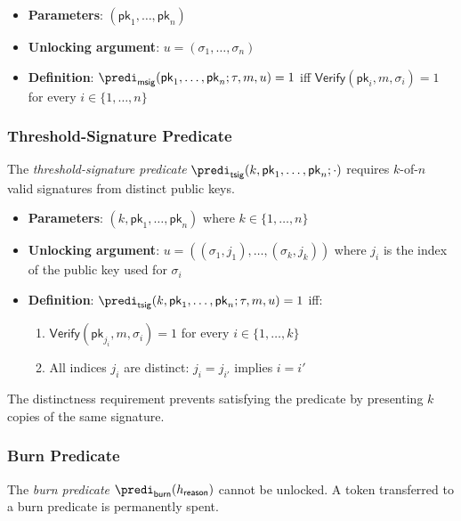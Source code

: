\begin{itemize}
	\item \textbf{Parameters}: $(\mathsf{pk}_1, \ldots, \mathsf{pk}_n)$
	\item \textbf{Unlocking argument}: $u = (\sigma_1, \ldots, \sigma_n)$
	\item \textbf{Definition}: $\predi_\mathsf{msig}(\mathsf{pk}_1, \ldots, \mathsf{pk}_n; \tau, m, u) = 1$ iff $\mathsf{Verify}(\mathsf{pk}_i, m, \sigma_i) = 1$ for every $i \in \{1, \ldots, n\}$
\end{itemize}


\subsubsection{Threshold-Signature Predicate}

The \emph{threshold-signature predicate} $\predi_\mathsf{tsig}(k, \mathsf{pk}_1, \ldots, \mathsf{pk}_n;\cdot)$ requires $k$-of-$n$ valid signatures from distinct public keys.

\begin{itemize}
	\item \textbf{Parameters}: $(k, \mathsf{pk}_1, \ldots, \mathsf{pk}_n)$ where $k \in \{1, \ldots, n\}$
	\item \textbf{Unlocking argument}: $u = ((\sigma_1, j_1), \ldots, (\sigma_k, j_k))$ where $j_i$ is the index of the public key used for $\sigma_i$
	\item \textbf{Definition}: $\predi_\mathsf{tsig}(k, \mathsf{pk}_1, \ldots, \mathsf{pk}_n; \tau, m, u) = 1$ iff:
	\begin{enumerate}
		\item $\mathsf{Verify}(\mathsf{pk}_{j_i}, m, \sigma_i) = 1$ for every $i \in \{1, \ldots, k\}$
		\item All indices $j_i$ are distinct: $j_i = j_{i'}$ implies $i = i'$
	\end{enumerate}
\end{itemize}

The distinctness requirement prevents satisfying the predicate by presenting $k$ copies of the same signature.


\subsubsection{Burn Predicate}\label{sec:burn-predicate}

The \emph{burn predicate} $\predi_\mathsf{burn}(h_\mathsf{reason})$ cannot be unlocked. A token transferred to a burn predicate is permanently spent.

